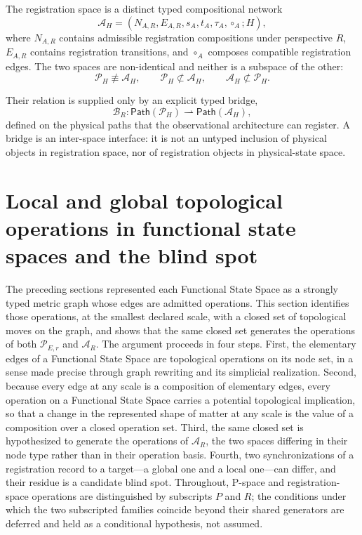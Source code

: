 \documentclass[10pt,twoside,a5paper]{article}
\newcommand{\Pspace}{\ensuremath{\mathcal P_H}}
\newcommand{\ARspace}{\ensuremath{\mathcal A_H}}
\newcommand{\Bridge}{\ensuremath{\mathcal B}}
\newcommand{\PathSet}{\ensuremath{\mathsf{Path}}}
\theoremstyle{definition}
\begin{document}
The registration space is a distinct typed compositional network
\begin{equation}
\ARspace=(N_{A,R},E_{A,R},s_A,t_A,\tau_A,\circ_A;H),
\label{eq:registration-space}
\end{equation}
where $N_{A,R}$ contains admissible registration compositions under perspective
$R$, $E_{A,R}$ contains registration transitions, and $\circ_A$ composes compatible
registration edges. The two spaces are non-identical and neither is a subspace of
the other:
\begin{equation}
\Pspace\not\equiv\ARspace,
\qquad
\Pspace\not\subset\ARspace,
\qquad
\ARspace\not\subset\Pspace.
\label{eq:space-separation}
\end{equation}

Their relation is supplied only by an explicit typed bridge,
\begin{equation}
\Bridge_R:\PathSet(\Pspace)\rightharpoonup\PathSet(\ARspace),
\label{eq:typed-bridge}
\end{equation}
defined on the physical paths that the observational architecture can register. A
bridge is an inter-space interface: it is not an untyped inclusion of physical
objects in registration space, nor of registration objects in physical-state space.

\section{Local and global topological operations in functional state spaces and the blind spot}
\label{sec:topological-operations-blindspot}

The preceding sections represented each Functional State Space as a strongly typed
metric graph whose edges are admitted operations. This section identifies those
operations, at the smallest declared scale, with a closed set of topological moves on
the graph, and shows that the same closed set generates the operations of both
$\mathcal{P}_{E,r}$ and $\mathcal{A}_{R}$. The argument proceeds in four steps. First,
the elementary edges of a Functional State Space are topological operations on its
node set, in a sense made precise through graph rewriting and its simplicial
realization. Second, because every edge at any scale is a composition of elementary
edges, every operation on a Functional State Space carries a potential topological
implication, so that a change in the represented shape of matter at any scale is the
value of a composition over a closed operation set. Third, the same closed set is
hypothesized to generate the operations of $\mathcal{A}_{R}$, the two spaces differing
in their node type rather than in their operation basis. Fourth, two synchronizations
of a registration record to a target---a global one and a local one---can differ, and
their residue is a candidate blind spot. Throughout, P-space and registration-space
operations are distinguished by subscripts $P$ and $R$; the conditions under which
the two subscripted families coincide beyond their shared generators are deferred and
held as a conditional hypothesis, not assumed.
\end{document}
